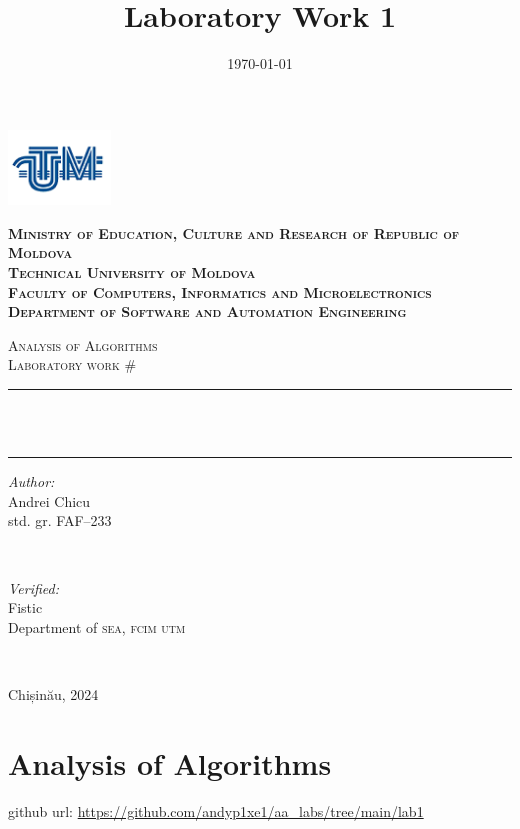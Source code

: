 \documentclass[a4paper,12pt]{article}
\date{\today}
\title{Laboratory Work 1}
\begin{document}
\begin{titlepage}
\centering

\includegraphics[height=2cm]{utm_logo.png}

\bfseries
\textsc{Ministry of Education, Culture and Research of Republic of Moldova} \\
\textsc{Technical University of Moldova} \\
\textsc{Faculty of Computers, Informatics and Microelectronics} \\
\textsc{Department of Software and Automation Engineering} \\
\mdseries

\vfill

\textsc{\Large Analysis of Algorithms} \\
\textsc{\large Laboratory work \#\Num}\\[0.5cm]

\vspace{12pt}
\newcommand{\HRule}{\rule{\linewidth}{0.5mm}}
\HRule \\[0.2cm]
{ \LARGE \bfseries \Topic }\\[0.4cm]
\HRule
\vfill

\begin{minipage}[t]{0.4\textwidth}
\begin{flushleft} \large
\emph{Author:} \\
Andrei Chicu\\                        
std. gr. FAF--233
\end{flushleft}
\end{minipage}
~
\begin{minipage}[t]{0.4\textwidth}
\raggedleft \large
\emph{Verified:} \\
Fistic \\
Department of \textsc{sea, fcim utm}
\end{minipage}\\[3cm]
\vfill

Chișinău, 2024
\end{titlepage}
\setcounter{page}{2}
\section{Analysis of Algorithms}
\label{sec:org5117114}
github url: \url{https://github.com/andyp1xe1/aa_labs/tree/main/lab1}
\end{document}
